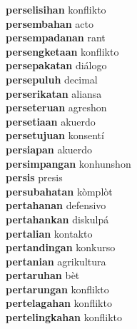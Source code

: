 \textbf{perselisihan } konflikto \\
\textbf{persembahan } acto \\
\textbf{persempadanan } rant \\
\textbf{persengketaan } konflikto \\
\textbf{persepakatan } diálogo \\
\textbf{persepuluh } decimal \\
\textbf{perserikatan } aliansa \\
\textbf{perseteruan } agreshon \\
\textbf{persetiaan } akuerdo \\
\textbf{persetujuan } konsentí \\
\textbf{persiapan } akuerdo \\
\textbf{persimpangan } konhunshon \\
\textbf{persis } presis \\
\textbf{persubahatan } kòmplòt \\
\textbf{pertahanan } defensivo \\
\textbf{pertahankan } diskulpá \\
\textbf{pertalian } kontakto \\
\textbf{pertandingan } konkurso \\
\textbf{pertanian } agrikultura \\
\textbf{pertaruhan } bèt \\
\textbf{pertarungan } konflikto \\
\textbf{pertelagahan } konflikto \\
\textbf{pertelingkahan } konflikto \\
